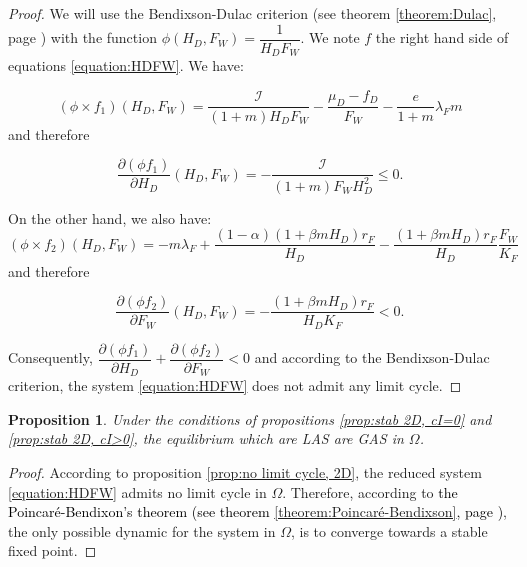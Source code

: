 \documentclass{article}
\newcommand{\lfw}{\lambda_{F}}
\newcommand{\lfw}{\lambda_{F}}
\newcommand{\cI}{\mathcal{I}}
\newcommand{\vdeux}[1]{\textcolor{black}{#1}}
\newtheorem{prop}[theorem]{Proposition}
\theoremstyle{definition}
\theoremstyle{remark}
\begin{document}
\begin{proof}
We will use the Bendixson-Dulac criterion (see theorem \ref{theorem:Dulac}, page \pageref{theorem:Dulac}) with the function $\phi(H_D, F_W) = \dfrac{1}{H_D F_W}$. We note $f$ the right hand side of equations \eqref{equation:HDFW}. We have:

\begin{equation*}
(\phi \times f_1)(H_D, F_W) = \dfrac{\cI}{(1+m)H_D F_W} -\dfrac{\mu_D - f_D}{F_W} - \dfrac{e}{1+m}\lfw m
\end{equation*} and therefore

\begin{equation*}
\dfrac{\partial (\phi f_1)}{\partial H_D}(H_D, F_W) = - \dfrac{\cI}{(1+m)F_W H_D^2} \leq 0.
\end{equation*}

On the other hand, we also have:
\begin{equation*}
(\phi \times f_2)(H_D, F_W) = - m \lfw + \dfrac{(1-\alpha) (1+ \beta m H_D) r_F}{H_D} - \dfrac{(1+\beta m H_D) r_F}{H_D} \dfrac{F_W}{K_F}
\end{equation*} and therefore

\begin{equation*}
\dfrac{\partial (\phi f_2)}{\partial F_W}(H_D, F_W) = - \dfrac{(1+\beta m H_D) r_F}{H_D K_F} <0.
\end{equation*}

Consequently, $\dfrac{\partial (\phi f_1)}{\partial H_D} + \dfrac{\partial (\phi f_2)}{\partial F_W} < 0$ and according to the Bendixson-Dulac criterion, the system \eqref{equation:HDFW} does not admit any limit cycle.

\end{proof}


\begin{prop} \label{prop:GAS, 2D}
Under the conditions of propositions \ref{prop:stab 2D, cI=0} and \ref{prop:stab 2D, cI>0}, the equilibrium which are LAS are GAS in $\Omega$.
\end{prop}


\begin{proof}
According to proposition \ref{prop:no limit cycle, 2D}, the reduced system \eqref{equation:HDFW} admits no limit cycle in $\Omega$. Therefore, according to \vdeux{the Poincaré-Bendixon's theorem (see theorem \ref{theorem:Poincaré-Bendixson}, page \pageref{theorem:Poincaré-Bendixson})}, the only possible dynamic for the system in $\Omega$, is to converge towards a stable fixed point. 
\end{proof}
\end{document}
